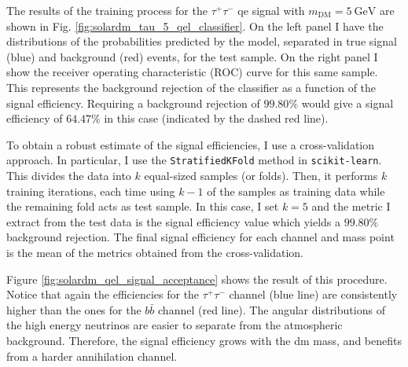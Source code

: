The results of the training process for the $\tau^{+}\tau^{-}$ \gls{qe} signal with $m_{\mathrm{DM}} = 5 \ \mathrm{GeV}$ are shown in Fig. \ref{fig:solardm_tau_5_qel_classifier}. On the left panel I have the distributions of the probabilities predicted by the model, separated in true signal (blue) and background (red) events, for the test sample. On the right panel I show the receiver operating characteristic (ROC) curve for this same sample. This represents the background rejection of the classifier as a function of the signal efficiency. Requiring a background rejection of $99.80\%$ would give a signal efficiency of $64.47\%$ in this case (indicated by the dashed red line).

To obtain a robust estimate of the signal efficiencies, I use a cross-validation approach. In particular, I use the \texttt{StratifiedKFold} method in \texttt{scikit-learn}. This divides the data into $k$ equal-sized samples (or folds). Then, it performs $k$ training iterations, each time using $k-1$ of the samples as training data while the remaining fold acts as test sample. In this case, I set $k=5$ and the metric I extract from the test data is the signal efficiency value which yields a $99.80\%$ background rejection. The final signal efficiency for each channel and mass point is the mean of the metrics obtained from the cross-validation.

Figure \ref{fig:solardm_qel_signal_acceptance} shows the result of this procedure. Notice that again the efficiencies for the $\tau^{+}\tau^{-}$ channel (blue line) are consistently higher than the ones for the $b\bar{b}$ channel (red line). The angular distributions of the high energy neutrinos are easier to separate from the atmospheric background. Therefore, the signal efficiency grows with the \gls{dm} mass, and benefits from a harder annihilation channel.

